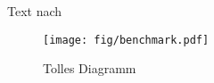  Text nach \citet{Chitchyan2004}

\begin{figure}
	\centering
	\texttt{[image: fig/benchmark.pdf]}
	\caption{Tolles Diagramm}
\label{fig:diagramm}
\end{figure} 
